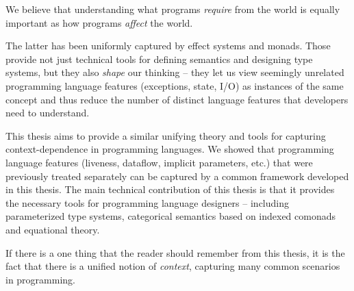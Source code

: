 We believe that understanding what programs \emph{require} from the world is equally important as
how programs \emph{affect} the world.

The latter has been uniformly captured by effect systems and monads. Those provide not just
technical tools for defining semantics and designing type systems, but they also \emph{shape}
our thinking -- they let us view seemingly unrelated programming language features (exceptions,
state, I/O) as instances of the same concept and thus reduce the number of distinct language
features that developers need to understand.

This thesis aims to provide a similar unifying theory and tools for capturing context-dependence
in programming languages. We showed that programming language features (liveness, dataflow,
implicit parameters, etc.) that were previously treated separately can be captured by a common
framework developed in this thesis. The main technical contribution of this thesis is that it
provides the necessary tools for programming language designers -- including parameterized type
systems, categorical semantics based on indexed comonads and equational theory.

If there is a one thing that the reader should remember from this thesis, it is the fact that
there is a unified notion of \emph{context}, capturing many common scenarios in programming.
